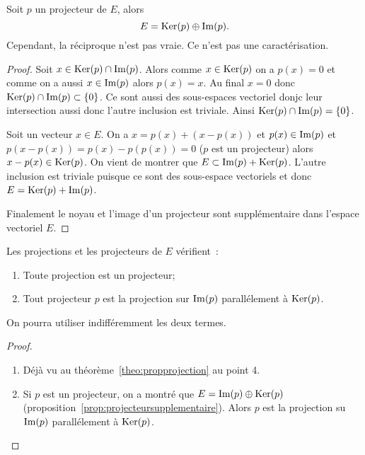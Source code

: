 \begin{prop}\label{prop:projecteursupplementaire}
  Soit \(p\) un projecteur de \(E\), alors
  \begin{equation}
    E = \operatorname{Ker}(p) \oplus \operatorname{Im}(p).
  \end{equation}
  Cependant, la réciproque n'est pas vraie. Ce n'est pas une caractérisation.
\end{prop}
\begin{proof}
  Soit \(x \in \operatorname{Ker}(p) \cap \operatorname{Im}(p)\). Alors comme \(x \in \operatorname{Ker}(p)\) on a \(p(x)=0\) et comme on a aussi \(x \in \operatorname{Im}(p)\) alors \(p(x)=x\). Au final \(x = 0\) donc \(\operatorname{Ker}(p) \cap \operatorname{Im}(p) \subset \{0\}\). Ce sont aussi des sous-espaces vectoriel donjc leur intersection aussi donc l'autre inclusion est triviale. Ainsi \(\operatorname{Ker}(p) \cap \operatorname{Im}(p)=\{0\}\).

  Soit un vecteur \(x \in E\). On a \(x = p(x) +(x-p(x))\) et \(p(x) \in \operatorname{Im}(p)\) et \(p(x-p(x))=p(x)-p(p(x))=0\) (\(p\) est un projecteur) alors \(x-p(x) \in \operatorname{Ker}(p)\). On vient de montrer que \(E \subset \operatorname{Im}(p) + \operatorname{Ker}(p)\). L'autre inclusion est triviale puisque ce sont des sous-espace vectoriels et donc \(E = \operatorname{Ker}(p) +\operatorname{Im}(p)\).

  Finalement le noyau et l'image d'un projecteur sont supplémentaire dans l'espace vectoriel \(E\).
\end{proof}

\begin{prop}
Les projections et les projecteurs de \(E\) vérifient~:
  \begin{enumerate}
  \item Toute projection est un projecteur;
  \item Tout projecteur \(p\) est la projection sur \(\operatorname{Im}(p)\) parallélement à \(\operatorname{Ker}(p)\).
  \end{enumerate}
  On pourra utiliser indifféremment les deux termes.
\end{prop}
\begin{proof}
  \begin{enumerate}
  \item Déjà vu au théorème~\ref{theo:propprojection} au point 4.
  \item Si \(p\) est un projecteur, on a montré que \(E = \operatorname{Im}(p) \oplus \operatorname{Ker}(p)\) (proposition~\ref{prop:projecteursupplementaire}). Alors \(p\) est la projection su \(\operatorname{Im}(p)\) parallélement à \(\operatorname{Ker}(p)\).
  \end{enumerate}
\end{proof}

